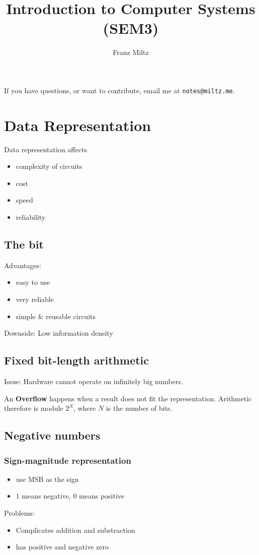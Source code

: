\documentclass{article}
\begin{document}
\title{Introduction to Computer Systems (SEM3)}
\author{Franz Miltz}
\maketitle
\noindent If you have questions, or want to contribute, email me at \texttt{notes@miltz.me}.
\tableofcontents
\pagebreak
\section{Data Representation}
Data representation affects
\begin{itemize}
	\item complexity of circuits
	\item cost
	\item speed
	\item reliability
\end{itemize}
\subsection{The bit}
Advantages:
\begin{itemize}
	\item easy to use
	\item very reliable
	\item simple \& reusable circuits
\end{itemize}
Downside: Low information density
\subsection{Fixed bit-length arithmetic}
Issue: Hardware cannot operate on infinitely big numbers.
\begin{definition}
	An \textbf{Overflow} happens when a result does not fit the representation.
	Arithmetic therefore is module $2^N$, where $N$ is the number of bits.
\end{definition}
\subsection{Negative numbers}
\subsubsection{Sign-magnitude representation}
\begin{itemize}
	\item use MSB as the sign
	\item $1$ means negative, $0$ means positive
\end{itemize}
Problems: \begin{itemize}
	\item Complicates addition and substraction
	\item has positive and negative zero
\end{itemize}
\end{document}
